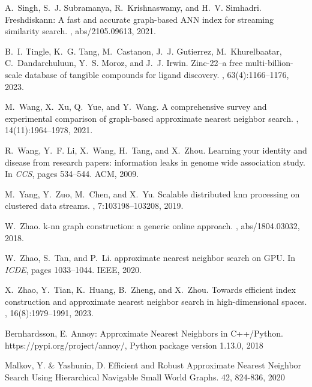\documentclass[11pt]{article}
\begin{document}
\begin{thebibliography}{10}
\begin{small}
A.~Singh, S.~J. Subramanya, R.~Krishnaswamy, and H.~V. Simhadri.
\newblock Freshdiskann: {A} fast and accurate graph-based {ANN} index for
streaming similarity search.
, abs/2105.09613, 2021.

B.~I. Tingle, K.~G. Tang, M.~Castanon, J.~J. Gutierrez, M.~Khurelbaatar,
C.~Dandarchuluun, Y.~S. Moroz, and J.~J. Irwin.
\newblock Zinc-22--a free multi-billion-scale database of tangible compounds
for ligand discovery.
, 63(4):1166--1176, 2023.

M.~Wang, X.~Xu, Q.~Yue, and Y.~Wang.
\newblock A comprehensive survey and experimental comparison of graph-based
approximate nearest neighbor search.
, 14(11):1964--1978, 2021.

R.~Wang, Y.~F. Li, X.~Wang, H.~Tang, and X.~Zhou.
\newblock Learning your identity and disease from research papers: information
leaks in genome wide association study.
\newblock In {\em {CCS}}, pages 534--544. {ACM}, 2009.

M.~Yang, Y.~Zuo, M.~Chen, and X.~Yu.
\newblock Scalable distributed knn processing on clustered data streams.
, 7:103198--103208, 2019.

W.~Zhao.
\newblock k-nn graph construction: a generic online approach.
, abs/1804.03032, 2018.

W.~Zhao, S.~Tan, and P.~Li.
 approximate nearest neighbor search on {GPU}.
\newblock In {\em {ICDE}}, pages 1033--1044. {IEEE}, 2020.

X.~Zhao, Y.~Tian, K.~Huang, B.~Zheng, and X.~Zhou.
\newblock Towards efficient index construction and approximate nearest neighbor
search in high-dimensional spaces.
, 16(8):1979--1991, 2023.

Bernhardsson, E. 
\newblock Annoy: Approximate Nearest Neighbors in C++/Python.
\newblock https://pypi.org/project/annoy/, Python package version 1.13.0, 2018

Malkov, Y. \& Yashunin, D. 
\newblock Efficient and Robust Approximate Nearest Neighbor Search Using Hierarchical Navigable Small World Graphs. 
 42, 824-836, 2020 


\end{small}
\end{thebibliography}
\end{document}
